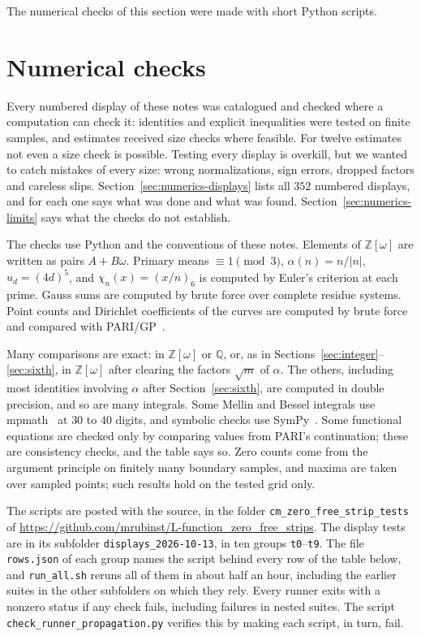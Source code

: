 \documentclass[11pt]{article}
\numberwithin{equation}{section}
\newcommand{\OO}{\mathbb Z[\omega]}
\begin{document}
The numerical checks of this section were made with short Python scripts.

\section{Numerical checks}\label{sec:numerics}

Every numbered display of these notes was catalogued and checked where a computation can check it: identities
and explicit inequalities were tested on finite samples, and estimates received size checks where feasible.
For twelve estimates not even a size check is possible. Testing every display is overkill, but we wanted to catch mistakes of every size: wrong normalizations,
sign errors, dropped factors and careless slips. Section~\ref{sec:numerics-displays} lists all $352$ numbered displays, and for each one says what was
done and what was found. Section~\ref{sec:numerics-limits} says what the checks do not establish.

The checks use Python and the conventions of these notes. Elements of $\OO$ are written as pairs $A+B\omega$.
Primary means $\equiv1\pmod3$, $\alpha(n)=n/|n|$, $u_d=(4d)^5$, and $\chi_n(x)=(x/n)_6$ is computed by Euler's
criterion at each prime. Gauss sums are computed by brute force over complete residue systems. Point counts and
Dirichlet coefficients of the curves are computed by brute force and compared with PARI/GP~\cite{PARI}.

Many comparisons are exact: in $\OO$ or $\mathbb Q$, or, as in
Sections~\ref{sec:integer}--\ref{sec:sixth}, in $\OO$ after clearing the factors $\sqrt m$ of $\alpha$. The
others, including most identities involving $\alpha$ after Section~\ref{sec:sixth}, are computed in double
precision, and so are many integrals. Some Mellin and Bessel integrals use mpmath~\cite{mpmath} at $30$ to $40$ digits, and
symbolic checks use SymPy~\cite{SymPy}. Some functional equations are checked only by comparing values from PARI's
continuation; these are consistency checks, and the table says so. Zero counts come from the argument principle on
finitely many boundary samples, and maxima are taken over sampled points; such results hold on the tested grid
only.

The scripts are posted with the source, in the folder \texttt{cm\_zero\_free\_strip\_tests} of
\url{https://github.com/mrubinst/L-function_zero_free_strips}. The display tests are in its subfolder
\texttt{displays\_2026-10-13}, in ten groups \texttt{t0}--\texttt{t9}. The file \texttt{rows.json} of each group
names the script behind every row of the table below, and \texttt{run\_all.sh} reruns all of them in about half an
hour, including the earlier suites in the other subfolders on which they rely. Every runner
exits with a nonzero status if any check fails, including failures in nested suites. The script
\texttt{check\_runner\_propagation.py} verifies this by making each script, in turn, fail.
\end{document}
